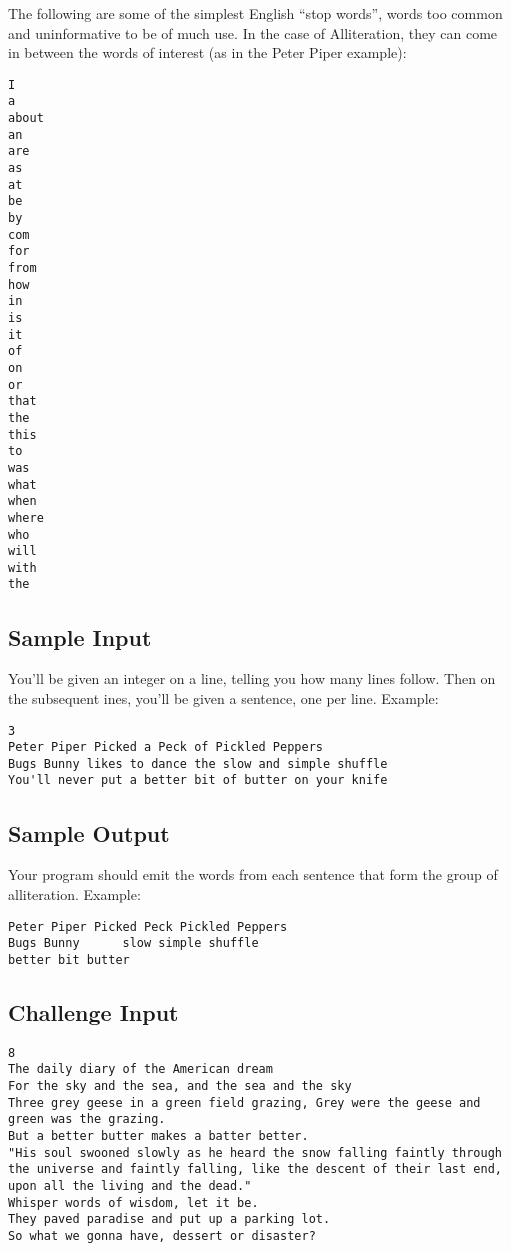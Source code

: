 The following are some of the simplest English ``stop words'', words too
common and uninformative to be of much use. In the case of Alliteration,
they can come in between the words of interest (as in the Peter Piper
example):

\begin{verbatim}
I 
a 
about 
an 
are 
as 
at 
be 
by 
com 
for 
from
how
in 
is 
it 
of 
on 
or 
that
the 
this
to 
was 
what 
when
where
who 
will 
with
the
\end{verbatim}

\subsection{Sample Input}\label{sample-input}

You'll be given an integer on a line, telling you how many lines follow.
Then on the subsequent ines, you'll be given a sentence, one per line.
Example:

\begin{verbatim}
3
Peter Piper Picked a Peck of Pickled Peppers
Bugs Bunny likes to dance the slow and simple shuffle
You'll never put a better bit of butter on your knife
\end{verbatim}

\subsection{Sample Output}\label{sample-output}

Your program should emit the words from each sentence that form the
group of alliteration. Example:

\begin{verbatim}
Peter Piper Picked Peck Pickled Peppers
Bugs Bunny      slow simple shuffle
better bit butter
\end{verbatim}

\subsection{Challenge Input}\label{challenge-input-9}

\begin{verbatim}
8
The daily diary of the American dream
For the sky and the sea, and the sea and the sky
Three grey geese in a green field grazing, Grey were the geese and green was the grazing.
But a better butter makes a batter better.
"His soul swooned slowly as he heard the snow falling faintly through the universe and faintly falling, like the descent of their last end, upon all the living and the dead."
Whisper words of wisdom, let it be.
They paved paradise and put up a parking lot.
So what we gonna have, dessert or disaster?
\end{verbatim}

